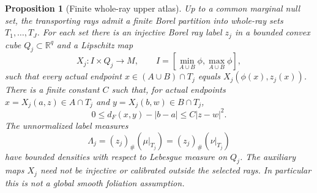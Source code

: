 \documentclass[11pt,reqno]{amsart}
\newtheorem{proposition}[theorem]{Proposition}
\theoremstyle{definition}
\theoremstyle{remark}
\numberwithin{equation}{section}
\newcommand{\R}{\mathbb R}
\begin{document}
\begin{proposition}[Finite whole-ray upper atlas]
\label{prop:general-upper-atlas}
Up to a common marginal null set, the transporting rays admit a finite
Borel partition into whole-ray sets \(T_1,\ldots,T_J\). For each set
there is an injective Borel ray label \(z_j\) in a bounded convex cube
\(Q_j\subset\R^q\) and a Lipschitz map
\[
 X_j:I\times Q_j\longrightarrow M,
 \qquad I=[\min_{A\cup B}\phi,\max_{A\cup B}\phi],
\]
such that every actual endpoint \(x\in(A\cup B)\cap T_j\) equals
\(X_j(\phi(x),z_j(x))\). There is a finite constant \(C\) such that,
for actual endpoints \(x=X_j(a,z)\in A\cap T_j\) and
\(y=X_j(b,w)\in B\cap T_j\),
\begin{equation}
\label{eq:general-upper-quadratic}
 0\le d_F(x,y)-|b-a|\le C|z-w|^2.
\end{equation}
The unnormalized label measures
\[
 \Lambda_j=(z_j)_\#(\mu|_{T_j})
           =(z_j)_\#(\nu|_{T_j})
\]
have bounded densities with respect to Lebesgue measure on \(Q_j\).
The auxiliary maps \(X_j\) need not be injective or calibrated outside
the selected rays. In particular this is not a global smooth foliation
assumption.
\end{proposition}
\end{document}
